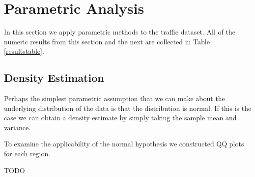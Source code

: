\documentclass[12pt]{article}
\begin{document}
\section{Parametric Analysis}
In this section we apply parametric methods to the traffic dataset. All of the numeric results from this section and the next are collected in Table \ref{resultstable}.
\subsection{Density Estimation}
Perhaps the simplest parametric assumption that we can make about the underlying distribution of the data is that the distribution is normal. If this is the case we can obtain a density estimate by simply taking the sample mean and variance.

To examine the applicability of the normal hypothesis we constructed QQ plots for each region. 


TODO




\end{document}
